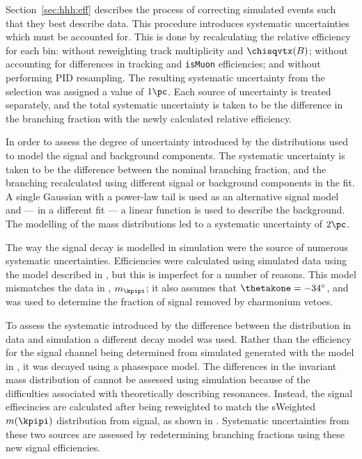 Section~\ref{sec:hhh:eff} describes the process of correcting simulated events such that they best
describe data.
This procedure introduces systematic uncertainties which must be accounted for.
This is done by recalculating the relative efficiency for each \qsq bin:
without reweighting track multiplicity and $\chisqvtx(B)$;
without accounting for differences in tracking and {\tt isMuon} efficiencies;
and without performing PID resampling.
The resulting systematic uncertainty from the selection was assigned a value of $1\pc$.
Each source of uncertainty is treated separately, and the total systematic uncertainty is taken to
be the difference in the branching fraction with the newly calculated relative efficiency.

In order to assess the degree of uncertainty introduced by the distributions used to model the
signal and background components.
The systematic uncertainty is taken to be the difference between the nominal branching fraction,
and the branching recalculated using different signal or background components in the fit.
A single Gaussian with a power-law tail is used as an alternative signal model and --- in a
different fit --- a linear function is used to describe the background.
The modelling of the mass distributions led to a systematic uncertainty of $2\pc$.

The way the signal decay is modelled in simulation were the source of numerous systematic
uncertainties.
Efficiencies were calculated using simulated data using the model described in
, but this is imperfect for a number of reasons.
This model mismatches the data in \qsq, $m_\kpipi$; it also assumes that $\thetakone=-34^\circ$,
and was used to determine the fraction of signal removed by charmonium vetoes.

To assess the systematic introduced by the difference between the \qsq distribution in data and
simulation a different decay model was used.
Rather than the efficiency for the signal channel being determined from simulated
 generated with the model in , it was decayed
using a phasespace model.
The differences in the invariant mass distribution of \kpipi cannot be assessed using simulation
because of the difficulties associated with theoretically describing \kpipi resonances.
Instead, the signal effiecincies are calculated after being reweighted to match the sWeighted
$m(\kpipi)$ distribution from signal, as shown in .
Systematic uncertainties from these two sources are assessed by redetermining branching fractions
using these new signal efficiencies.

